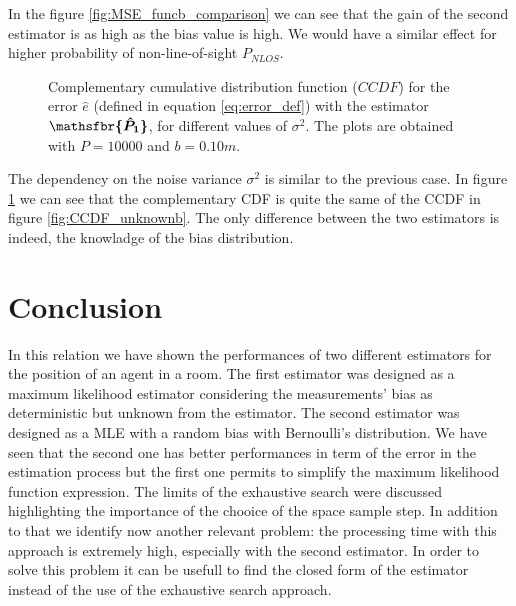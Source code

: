 \documentclass[%
    twoside, 
    a4paper
    ]{article}
\DeclareRobustCommand{\msf}[1]{%
  \ifcat\noexpand#1\relax\msfgreek{#1}\else\mathsfbr{#1}\fi%
}
\begin{document}
    In the figure \ref{fig:MSE_funcb_comparison} we can see that the gain of the second estimator
    is as high as the bias value is high. We would have a similar effect for higher probability of 
    non-line-of-sight $P_{NLOS}$.
    \begin{figure}[t]
        \centering
        
        \caption{Complementary cumulative distribution function ($CCDF$) for the error $\hat{e}$ 
        (defined in equation \ref{eq:error_def}) with the estimator $\bm{\msf{\hat{P}_1}}$, for 
        different values of $\sigma^2$. The plots are 
        obtained with $P=10000$ and $b=0.10 \si{m}$.}
        \label{fig:CCDF_randomb}
    \end{figure}
    The dependency on the noise variance $\sigma^2$ is similar to the previous case. In figure 
    \ref{fig:CCDF_randomb} we can see that the complementary CDF is quite the same of the CCDF in 
    figure \ref{fig:CCDF_unknownb}. The only difference between the two estimators is indeed, the 
    knowladge of the bias distribution.

    \section{Conclusion}
    In this relation we have shown the performances of two different estimators for the position 
    of an agent in a room. The first estimator was designed as a maximum likelihood estimator 
    considering the measurements' bias as deterministic but unknown from the estimator. The second
    estimator was designed as a MLE with a random bias with Bernoulli's distribution.
    We have seen that the second one has better performances in term of the error in the estimation
    process but the first one permits to simplify the maximum likelihood function expression.
    The limits of the exhaustive search were discussed highlighting the importance of the chooice of 
    the space sample step.
    In addition to that we identify now another relevant problem: the processing time with this 
    approach is extremely high, especially with the second estimator. In order to solve this problem
    it can be usefull to find the closed form of the estimator instead of the use of the exhaustive
    search approach.
\end{document}

